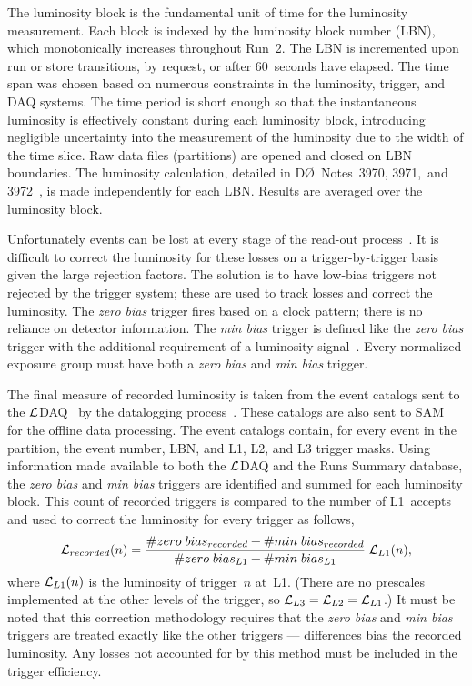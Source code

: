 \documentclass[12pt]{article}
\begin{document}
The luminosity block is the fundamental unit of time for the
luminosity measurement.  Each block is indexed by the luminosity block
number (LBN), which monotonically increases throughout Run~2.  The LBN
is incremented upon run or store transitions, by request, or after
60~seconds have elapsed.  The time span was chosen based on numerous
constraints in the luminosity, trigger, and DAQ systems.  The time
period is short enough so that the instantaneous luminosity is
effectively constant during each luminosity block, introducing
negligible uncertainty into the measurement of the luminosity due to
the width of the time slice.  Raw data files (partitions) are opened
and closed on LBN boundaries.  The luminosity calculation, detailed in
D\O~Notes~3970, 3971,~and 3972~\cite{3970,3971,3972}, is made
independently for each LBN.  Results are averaged over the luminosity
block.

Unfortunately events can be lost at every stage of the read-out
process~\cite{3972}.  It is difficult to correct the luminosity for
these losses on a trigger-by-trigger basis given the large rejection
factors.  The solution is to have low-bias triggers not rejected by
the trigger system; these are used to track losses and correct the
luminosity.  The {\it zero bias} trigger fires based on a clock
pattern; there is no reliance on detector information.  The {\it min
bias} trigger is defined like the {\it zero bias} trigger with the
additional requirement of a luminosity signal~\cite{3973}.  Every
normalized exposure group must have both a {\it zero bias} and {\it
min bias} trigger.

The final measure of recorded luminosity is taken from the event
catalogs sent to the $\cal L$DAQ~\cite{XXXX-LDAQ} by the datalogging
process~\cite{3982}.  These catalogs are also sent to SAM~\cite{3465}
for the offline data processing.  The event catalogs contain, for
every event in the partition, the event number, LBN, and L1, L2, and
L3 trigger masks.  Using information made available to both the $\cal
L$DAQ and the Runs Summary database, the {\it zero bias} and {\it min
bias} triggers are identified and summed for each luminosity block.
This count of recorded triggers is compared to the number of
L1~accepts and used to correct the luminosity for every trigger as
follows,
\begin{equation}
{\cal L}_{recorded}(n) = {\# zero\;bias_{recorded} + \#
min\;bias_{recorded} \over \# zero\;bias_{L1} + \# min\;bias_{L1}}
\;{\cal L}_{L1}(n),
\label{eq:recorded}
\end{equation}
where ${\cal L}_{L1}(n)$ is the luminosity of trigger~$n$
at~L1. (There are no prescales implemented at the other levels of the
trigger, so ${\cal L}_{L3} = {\cal L}_{L2} = {\cal L}_{L1}$.)  It must
be noted that this correction methodology requires that the {\it zero
bias} and {\it min bias} triggers are treated exactly like the other
triggers --- differences bias the recorded luminosity.  Any losses not
accounted for by this method must be included in the trigger
efficiency.
\end{document}
